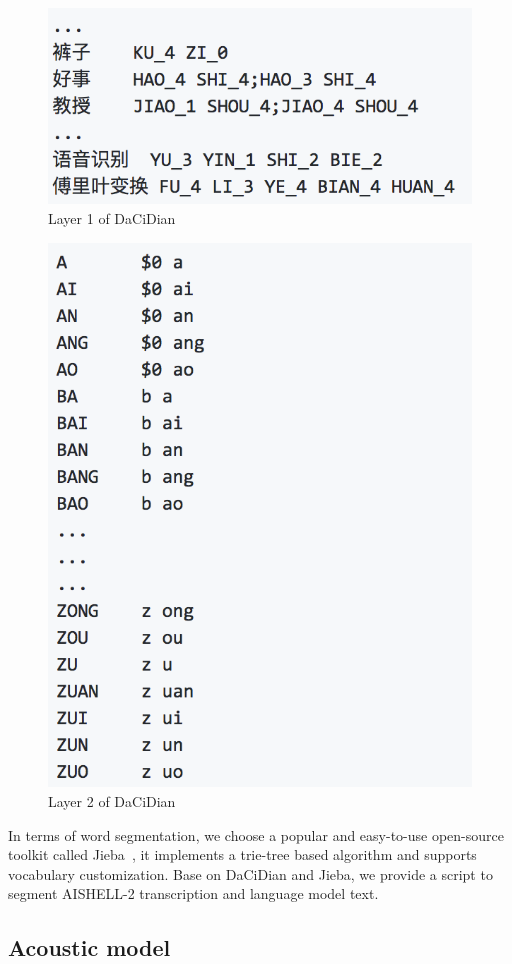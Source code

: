 \documentclass[a4paper]{article}
\begin{document}
\begin{figure}[t]
  \centering
  \includegraphics[width=0.8\linewidth]{dacidianl1.png}
  \caption{Layer 1 of DaCiDian}
  \label{fig:lex1}
\end{figure}
\begin{figure}[t]
  \centering
  \includegraphics[width=0.8\linewidth]{dacidianl2.png}
  \caption{Layer 2 of DaCiDian}
  \label{fig:lex2}
\end{figure}

In terms of word segmentation, we choose a popular and easy-to-use open-source
toolkit called Jieba~\cite{jieba}, it implements a trie-tree based algorithm and
supports vocabulary customization.  Base on DaCiDian and Jieba, we provide a
script to segment AISHELL-2 transcription and language model text.

\subsection{Acoustic model}
\end{document}
